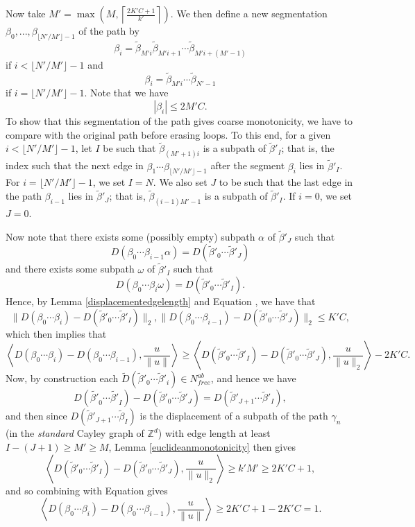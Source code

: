 \documentclass[12pt,reqno]{article}
\makeatletter
\let\reftagform@=\tagform@
\def\tagform@#1{\maketag@@@{(\ignorespaces\textcolor{purple}{#1}\unskip\@@italiccorr)}}
\renewcommand{\eqref}[1]{\textup{\reftagform@{\ref{#1}}}}
\numberwithin{equation}{section}
\newcommand{\Z}{\mathbb{Z}}
\newcommand{\pair}[2]{\left\langle #1, #2 \right\rangle}
\makeatother
\begin{document}
Now take $M' = \max(M, \left\lceil \frac{2K'C + 1}{k'} \right\rceil)$. We then define a new segmentation 
$\beta_0,...,\beta_{\lfloor N'/M' \rfloor - 1}$ of the path by
\[
   \beta_i = \tilde{\beta}_{M'i} \tilde{\beta}_{M'i + 1} \cdots \tilde{\beta}_{M'i + (M'-1)}
\]
if $i < \lfloor N'/M' \rfloor - 1$ and
\[
   \beta_i = \tilde{\beta}_{M'i} \cdots \tilde{\beta}_{N' - 1}
\]
if $i = \lfloor N'/M' \rfloor - 1$.
Note that we have
\[
   |\beta_i| \le 2M' C.
\]
To show that this segmentation of the path gives coarse monotonicity, we have to compare with the original path before erasing loops.
To this end, for a given $i < \lfloor N'/M' \rfloor - 1$, let $I$ be such that $\tilde{\beta}_{(M' + 1)i}$ is a subpath of $\tilde{\beta}'_I$;
that is, the index such that the next edge in $\beta_1 \cdots \beta_{\lfloor N'/M' \rfloor - 1}$ after the segment $\beta_i$
lies in $\tilde{\beta}'_I$. For $i = \lfloor N'/M' \rfloor - 1$, we set $I = N$.
We also set $J$ to be such that the last edge in the path $\beta_{i-1}$ lies in $\tilde{\beta}'_J$; that is, $\tilde{\beta}_{(i-1)M' - 1}$
is a subpath of $\tilde{\beta}'_I$. If $i=0$, we set $J=0$.

Now note that there exists some (possibly empty) subpath $\alpha$ of $\tilde{\beta}'_J$ such that 
\[
   D(\beta_0 \cdots \beta_{i-1} \alpha) = D(\tilde{\beta}'_0 \cdots \tilde{\beta}'_J)
\]
and there exists some subpath $\omega$ of $\tilde{\beta}'_I$ such that
\[
   D(\beta_0 \cdots \beta_i \omega) = D(\tilde{\beta}'_0 \cdots \tilde{\beta}'_I).
\]
Hence, by Lemma \ref{displacementedgelength} and Equation \eqref{eq:segmentbound}, we have that
\begin{equation} \label{eq:perturbedmonotone}
   \| D(\beta_0 \cdots \beta_i) - D(\tilde{\beta}'_0 \cdots \tilde{\beta}'_I) \|_2,
   \| D(\beta_0 \cdots \beta_{i-1}) - D(\tilde{\beta}'_0 \cdots \tilde{\beta}'_J) \|_2 \le K'C,
\end{equation}
which then implies that
\[
   \pair{ D(\beta_0 \cdots \beta_i) - D(\beta_0 \cdots \beta_{i-1}) }{\frac{u}{\|u\|}} 
   \ge \pair{ D(\tilde{\beta}'_0 \cdots \tilde{\beta}'_I) - D(\tilde{\beta}'_0 \cdots \tilde{\beta}'_J) }{ \frac{u}{\|u\|_2} } - 2K'C.
\]
Now, by construction each $\tilde{D}(\tilde{\beta}'_0 \cdots \tilde{\beta}'_i) \in N^{ab}_{free}$, and hence we have
\[
   D(\tilde{\beta'}_0 \cdots \tilde{\beta'}_I) - D(\tilde{\beta}'_0 \cdots \tilde{\beta}'_J) = D(\tilde{\beta}'_{J+1} \cdots \tilde{\beta}'_I),
\]
and then since $D(\tilde{\beta}'_{J+1} \cdots \tilde{\beta}_I)$ is the displacement of a subpath of the path $\gamma_n$ 
(in the \emph{standard} Cayley graph of $\Z^d$)
with edge length at least $I - (J+1) \ge M' \ge M$, Lemma \ref{euclideanmonotonicity} then gives
\[
   \pair{ D(\tilde{\beta}'_0 \cdots \tilde{\beta}'_I) - D(\tilde{\beta}'_0 \cdots \tilde{\beta}'_J) }{ \frac{u}{\|u\|_2} }
   \ge k'M' \ge 2K'C + 1,
\]
and so combining with Equation \eqref{eq:perturbedmonotone} gives
\[
   \pair{ D(\beta_0 \cdots \beta_i) - D(\beta_0 \cdots \beta_{i-1}) }{\frac{u}{\|u\|}} \ge 2K'C + 1 - 2K'C = 1.
\]
\end{document}
